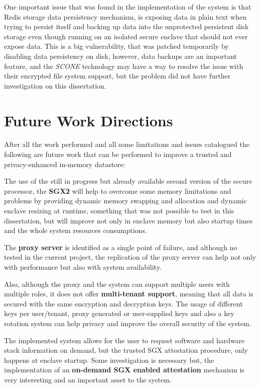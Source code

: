 One important issue that was found in the implementation of the system is that Redis storage data persistency mechanism, is exposing data in plain text when trying to persist itself and backing up data into the unprotected persistent disk storage even though running on an isolated secure enclave that should not ever expose data. This is a big vulnerability, that was patched temporarily by disabling data persistency on disk, however, data backups are an important feature, and the \textit{SCONE} technology may have a way to resolve the issue with their encrypted file system support, but the problem did not have further investigation on this dissertation.

\section{Future Work Directions}
\label{sec:future_work_directions}

After all the work performed and all some limitations and issues catalogued the following are future work that can be performed to improve a trusted and privacy-enhanced in-memory datastore:

The use of the still in progress but already available second version of the secure processor, the \textbf{\gls{SGX}2} will help to overcome some memory limitations and problems by providing dynamic memory swapping and allocation and dynamic enclave resizing at runtime, something that was not possible to test in this dissertation, but will improve not only in enclave memory but also startup times and the whole system resources consumptions.

The \textbf{proxy server} is identified as a single point of failure, and although no tested in the current project, the replication of the proxy server can help not only with performance but also with system availability.

Also, although the proxy and the system can support multiple users with multiple roles, it does not offer \textbf{multi-tenant support}, meaning that all data is secured with the same encryption and decryption keys. The usage of different keys per user/tenant, proxy generated or user-supplied keys and also a key rotation system can help privacy and improve the overall security of the system.

The implemented system allows for the user to request software and hardware stack information on demand, but the trusted \gls{SGX} attestation procedure, only happens at enclave startup. Some investigation is necessary but, the implementation of an \textbf{on-demand \gls{SGX} enabled attestation} mechanism is very interesting and an important asset to the system.

